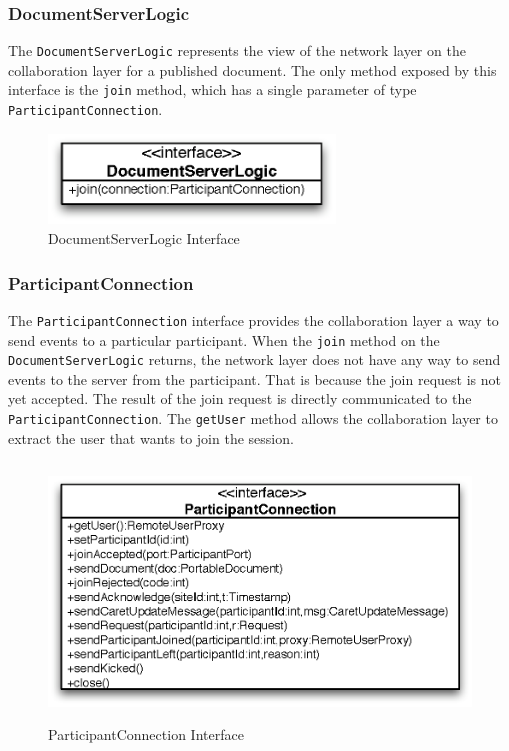 \subsubsection{DocumentServerLogic}
\label{sect:archoverview.net.documentserverlogic}
The \texttt{DocumentServerLogic} represents the view of the network layer
on the collaboration layer for a published document. The only method
exposed by this interface is the \texttt{join} method, which has a single
parameter of type \texttt{ParticipantConnection}.

\begin{figure}[H]
 \centering
 \includegraphics[width=7.62cm,height=2.40cm]{../images/finalreport/architecture_documentserverlogic_uml.eps}
 \caption{DocumentServerLogic Interface}
\end{figure}

\subsubsection{ParticipantConnection}
The \texttt{ParticipantConnection} interface provides the collaboration layer
a way to send events to a particular participant. When the \texttt{join}
method on the \texttt{DocumentServerLogic} returns, the network layer does
not have any way to send events to the server from the participant. That
is because the join request is not yet accepted. The result of the join
request is directly communicated to the \texttt{ParticipantConnection}.
The \texttt{getUser} method allows the collaboration layer to extract the
user that wants to join the session.

\begin{figure}[H]
 \centering
 \includegraphics[width=12.59cm,height=6.84cm]{../images/finalreport/architecture_participantconnection_uml.eps}
 \caption{ParticipantConnection Interface}
\end{figure}

